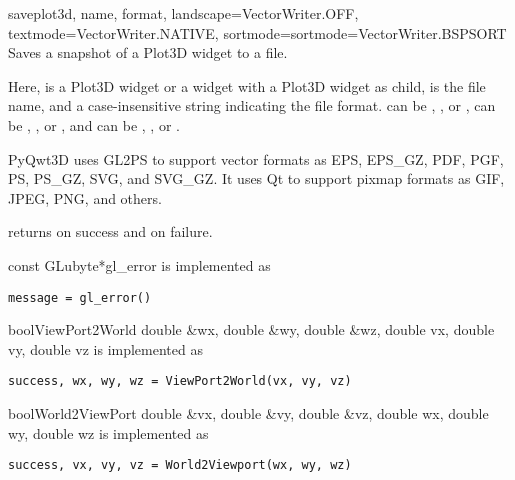 \documentclass{manual}
\begin{document}
\begin{funcdesc}{save}{plot3d, name, format,
    landscape=VectorWriter.OFF,
    textmode=VectorWriter.NATIVE,
    sortmode=sortmode=VectorWriter.BSPSORT}
  Saves a snapshot of a Plot3D widget to a file.

  Here,  is a Plot3D  widget or a widget with a Plot3D widget as
  child,  is the file name, and  a case-insensitive
  string indicating the file format.   can be
  , , or
  ,  can be
  , , or
  , and  can be
  , , or
  .

  PyQwt3D uses GL2PS to support vector formats as EPS, EPS_GZ, PDF, PGF, PS,
  PS_GZ, SVG, and SVG_GZ. It uses Qt to support pixmap formats as GIF, JPEG,
  PNG, and others.
    
   returns  on success and  on
  failure.
\end{funcdesc}


\begin{cfuncdesc}{const GLubyte*}{gl_error}{}
  is implemented as
  \begin{verbatim}
message = gl_error()
  \end{verbatim}
\end{cfuncdesc}

\begin{cfuncdesc}{bool}{ViewPort2World}
  {double \&wx, double \&wy, double \&wz, double vx, double vy, double vz}
  is implemented as
  \begin{verbatim}
success, wx, wy, wz = ViewPort2World(vx, vy, vz)
  \end{verbatim}
\end{cfuncdesc}

\begin{cfuncdesc}{bool}{World2ViewPort}
  {double \&vx, double \&vy, double \&vz, double wx, double wy, double wz}
  is implemented as
  \begin{verbatim}
success, vx, vy, vz = World2Viewport(wx, wy, wz)
  \end{verbatim}
\end{cfuncdesc}



\end{document}

